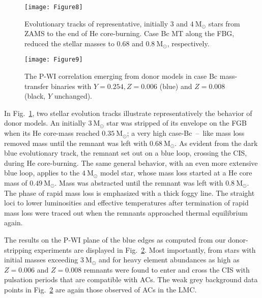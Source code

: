 \documentclass[a4paper,fleqn,usenatbib]{mnras}
\newcommand{\msol}{~\mathrm{M}_\odot}
\begin{document}
\begin{figure}
	\texttt{[image: Figure8]}
    \caption{Evolutionary tracks of representative, initially $3$ and $4 \msol$
    		 stars from ZAMS to the end of He core-burning. Case Bc MT along the FBG, 
    		 reduced the stellar masses to $0.68$ and $0.8 \msol$, respectively. }
    \label{fig:Bc_Donor}
\end{figure}

\begin{figure}
	\texttt{[image: Figure9]}
    \caption{The P-WI correlation emerging from  
    		 donor models in case Bc mass-transfer binaries 
    		 with $Y=0.254, Z=0.006$ (blue) and $Z=0.008$ (black, $Y$ unchanged). 
    		 }
    \label{fig:PWI_BcD}
\end{figure}

In Fig.~\ref{fig:Bc_Donor}, two stellar evolution tracks illustrate representatively 
the behavior of donor models. An initially $3 \msol$ star was stripped of its 
envelope on the FGB when its He core-mass reached $0.35 \msol$; 
a very high case-Bc~--~like mass loss removed mass until the remnant 
was left with $0.68 \msol$. As evident from the dark blue evolutionary track, 
the remnant set out on a blue loop, crossing the CIS, during He core-burning. 
The same general behavior, with an even more extensive blue loop, 
applies to the $4 \msol$ model star, whose mass loss started at 
a He core mass of $0.49 \msol$. Mass was abstracted until the remnant was left with $0.8 \msol$. 
The phase of rapid mass loss is emphasized with a thick foggy line. 
The straight loci to lower luminosities and effective temperatures after termination of rapid mass 
loss were traced out when the remnants approached thermal equilibrium again. 

The results on the P-WI plane of the blue edges 
as computed from our donor-stripping experiments are displayed in Fig.~\ref{fig:PWI_BcD}.
Most importantly, from stars with initial masses exceeding $3 \msol$ and for heavy 
element abundances as high as $Z=0.006$ and $Z=0.008$ remnants were found to enter 
and cross the CIS with pulsation periods that are compatible with ACs. The weak grey 
background data points in Fig.~\ref{fig:PWI_BcD} are again those 
observed of ACs in the LMC.
\end{document}
